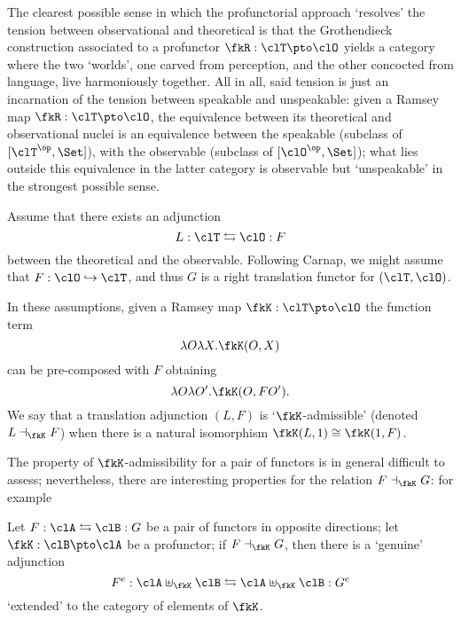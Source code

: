 \begin{remark}\label{resoudre_la_tension}
	The clearest possible sense in which the profunctorial approach `resolves' the tension between observational and theoretical is that the Gro\-then\-dieck construction associated to a profunctor $\fkR : \clT \pto \clO$ yields a category where the two `worlds', one carved from perception, and the other concocted from language, live harmoniously together. All in all, said tension is just an incarnation of the tension between speakable and unspeakable: given a Ramsey map $\fkR : \clT \pto \clO$, the equivalence between its theoretical and observational nuclei is an equivalence between the speakable (subclass of $[\clT^\op,\Set]$), with the observable (subclass of $[\clO^\op,\Set]$); what lies outside this equivalence in the latter category is observable but `unspeakable' in the strongest possible sense.
\end{remark}

\begin{remark}\label{carnap_translation_functors}
	Assume that there exists an adjunction 
	\[ 
		L : \clT \leftrightarrows \clO : F
	\]
	between the theoretical and the observable. Following Carnap, we might assume that $F : \clO \hookrightarrow \clT$, and thus $G$ is a right translation functor for $(\clT, \clO)$.

	In these assumptions, given a Ramsey map $\fkK : \clT \pto \clO$ the function term
	\[\lambda O\lambda X . \fkK(O, X)\]
	can be pre-composed with $F$ obtaining
	\[\lambda  O\lambda O'.\fkK( O, F O').\]
	We say that a translation adjunction $(L,F)$ is `$\fkK$-admissible' (denoted $L \dashv_\fkK F$) when there is a natural isomorphism $\fkK(L,1)\cong\fkK(1,F)$.
\end{remark}
The property of $\fkK$-admissibility for a pair of functors is in general difficult to assess; nevertheless, there are interesting properties for the relation $F\dashv_\fkK G$: for example
\begin{theorem}
	Let $F : \clA \leftrightarrows \clB: G$ be a pair of functors in opposite directions; let $\fkK : \clB \pto \clA$ be a profunctor; if $F\dashv_\fkK G$, then there is a `genuine' adjunction 
	\[ F^e : \clA\uplus_\fkK\clB \leftrightarrows \clA\uplus_\fkK\clB : G^e \]
	`extended' to the category of elements of $\fkK$.
\end{theorem}